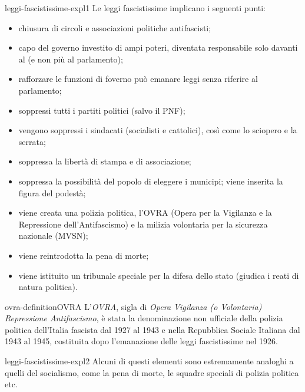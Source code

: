 \documentclass[preview]{standalone}
\begin{document}
\begin{snippet}{leggi-fascistissime-expl1}
    Le leggi fascistissime implicano i seguenti punti:
    \begin{itemize}
        \item chiusura di circoli e associazioni politiche antifascisti;
        \item capo del governo investito di ampi poteri, diventata responsabile solo davanti al (e non più al parlamento);
        \item rafforzare le funzioni di foverno può emanare leggi senza riferire al parlamento;
        \item soppressi tutti i partiti politici (salvo il PNF);
        \item vengono soppressi i sindacati (socialisti e cattolici), così come lo sciopero e la serrata;
        \item soppressa la libertà di stampa e di associazione;
        \item soppressa la possibilità del popolo di eleggere i municipi; viene inserita la figura del podestà;
        \item viene creata una polizia politica, l'OVRA (Opera per la Vigilanza e la Repressione dell'Antifascismo)
            e la milizia volontaria per la sicurezza nazionale (MVSN);
        \item viene reintrodotta la pena di morte;
        \item viene istituito un tribunale speciale per la difesa dello stato (giudica i reati di natura politica).
    \end{itemize}
\end{snippet}

\begin{snippetdefinition}{ovra-definition}{OVRA}
    L'\textit{OVRA}, sigla di \textit{Opera Vigilanza (o Volontaria) Repressione Antifascismo},
    è stata la denominazione non ufficiale della polizia politica dell'Italia fascista dal 1927 al 1943 e
    nella Repubblica Sociale Italiana dal 1943 al 1945, costituita dopo l'emanazione delle leggi fascistissime nel 1926. 
\end{snippetdefinition}

\begin{snippet}{leggi-fascistissime-expl2}
    Alcuni di questi elementi sono estremamente analoghi a quelli del socialismo, come la pena di morte,
    le squadre speciali di polizia politica etc.
\end{snippet}

\end{document}

